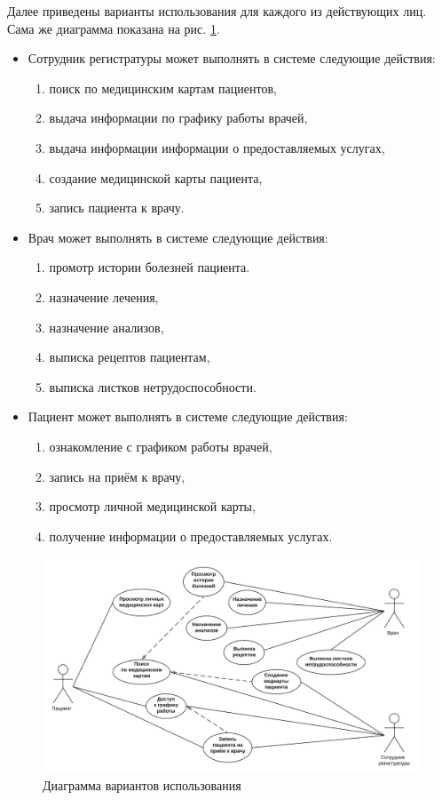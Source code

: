 \documentclass[14pt,a4paper,russian]{extreport}
\begin{document}
Далее приведены варианты использования для каждого из действующих лиц. Сама же диаграмма показана на
рис. \ref{fig:ClinicDB}.
\begin{itemize}[noitemsep]
    \item Сотрудник регистратуры может выполнять в системе следующие действия:
        \begin{enumerate}[noitemsep]
            \item поиск по медицинским картам пациентов,
            \item выдача информации по графику работы врачей,
            \item выдача информации информации о предоставляемых услугах,
            \item создание медицинской карты пациента,
            \item запись пациента к врачу.
        \end{enumerate}
    \item Врач может выполнять в системе следующие действия:
        \begin{enumerate}[noitemsep]
            \item промотр истории болезней пациента.
            \item назначение лечения,
            \item назначение анализов,
            \item выписка рецептов пациентам,
            \item выписка листков нетрудоспособности.
        \end{enumerate}
    \item Пациент может выполнять в системе следующие действия:
        \begin{enumerate}[noitemsep]
            \item ознакомление с графиком работы врачей,
            \item запись на приём к врачу,
            \item просмотр личной медицинской карты,
            \item получение информации о предоставляемых услугах.
        \end{enumerate}
\end{itemize}
\begin{figure}[h!]
        \includegraphics[width=\textwidth]{ClinicDB}
        \caption{Диаграмма вариантов использования}
        \label{fig:ClinicDB}
\end{figure}
\end{document}
